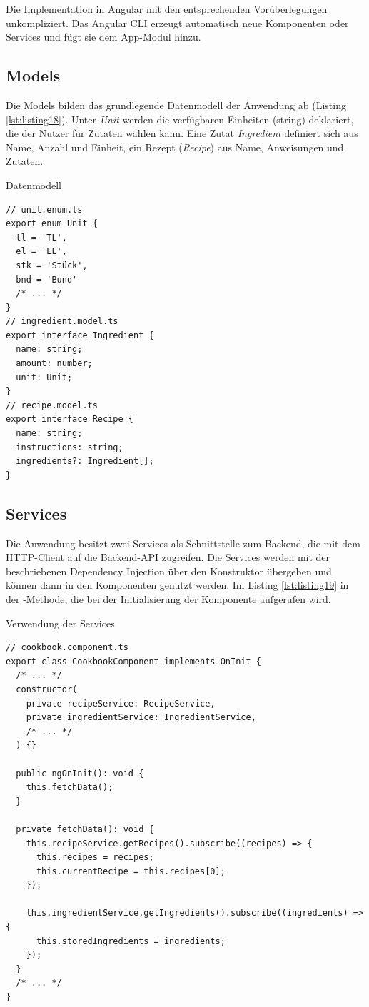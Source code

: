 Die Implementation in Angular mit den entsprechenden Vorüberlegungen unkompliziert. Das Angular CLI erzeugt automatisch neue Komponenten oder Services und fügt sie dem App-Modul hinzu. 

\subsection{Models}
Die Models bilden das grundlegende Datenmodell der Anwendung ab (Listing \ref{lst:listing18}). Unter \textit{Unit} werden die verfügbaren Einheiten (string) deklariert, die der Nutzer für Zutaten wählen kann. Eine Zutat \textit{Ingredient} definiert sich aus Name, Anzahl und Einheit, ein Rezept (\textit{Recipe}) aus Name, Anweisungen und Zutaten.

\begin{listing}
\caption{Datenmodell}
\label{lst:listing18}
\begin{verbatim}
// unit.enum.ts
export enum Unit {
  tl = 'TL',
  el = 'EL',
  stk = 'Stück',
  bnd = 'Bund'
  /* ... */
}
// ingredient.model.ts
export interface Ingredient {
  name: string;
  amount: number;
  unit: Unit;
}
// recipe.model.ts
export interface Recipe {
  name: string;
  instructions: string;
  ingredients?: Ingredient[];
}
\end{verbatim}
\end{listing}

\subsection{Services}\label{sssec:impl_services}
Die Anwendung besitzt zwei Services als Schnittstelle zum Backend, die mit dem HTTP-Client auf die Backend-API zugreifen. Die Services werden mit der beschriebenen Dependency Injection über den Konstruktor übergeben und können dann in den Komponenten genutzt werden. Im Listing \ref{lst:listing19} in der -Methode, die bei der Initialisierung der Komponente aufgerufen wird.

\begin{listing}
\caption{Verwendung der Services}
\label{lst:listing19}
\begin{verbatim}
// cookbook.component.ts
export class CookbookComponent implements OnInit {
  /* ... */
  constructor(
    private recipeService: RecipeService,
    private ingredientService: IngredientService,
    /* ... */
  ) {}

  public ngOnInit(): void {
    this.fetchData();
  }

  private fetchData(): void {
    this.recipeService.getRecipes().subscribe((recipes) => {
      this.recipes = recipes;
      this.currentRecipe = this.recipes[0];
    });

    this.ingredientService.getIngredients().subscribe((ingredients) => {
      this.storedIngredients = ingredients;
    });
  }
  /* ... */
}
\end{verbatim}
\end{listing}

